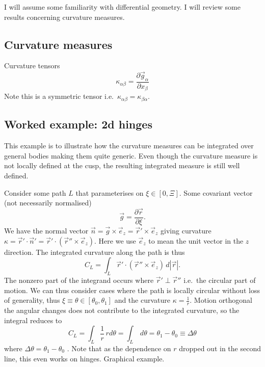 I will assume some familiarity with differential geometry.
I will review some results concerning curvature measures.

\subsection{Curvature measures}

Curvature tensors
\begin{equation}
  \kappa_{\alpha\beta} = \frac{\partial \vec{g}_\alpha}{\partial x_\beta}
\end{equation}
Note this is a symmetric tensor i.e.\ $\kappa_{\alpha\beta} = \kappa_{\beta\alpha}$.

\subsection{Worked example: 2d hinges}

This example is to illustrate how the curvature measures can be integrated over general bodies making them quite generic.
Even though the curvature measure is not locally defined at the cusp, the resulting integrated measure is still well defined.

Consider some path $L$ that parameterises on $\xi \in [0, \Xi]$.
Some covariant vector (not necessarily normalised)
\begin{equation*}
  \vec{g} = \frac{\partial \vec{r}}{\partial \xi}.
\end{equation*}
We have the normal vector $\vec{n} = \vec{g} \times \vec{e}_z = \vec{r}' \times \vec{e}_z$ giving curvature $\kappa = \vec{r}' \cdot \vec{n}' = \vec{r}' \cdot (\vec{r}'' \times \vec{e}_z)$.
Here we use $\vec{e}_z$ to mean the unit vector in the $z$ direction.
The integrated curvature along the path is thus
\begin{equation*}
  C_L = \int_L \vec{r}' \cdot ( \vec{r}'' \times \vec{e}_z ) \, d|\vec{r}|.
\end{equation*}
The nonzero part of the integrand occurs where $\vec{r}' \perp \vec{r}''$ i.e.\ the circular part of motion.
We can thus consider cases where the path is locally circular without loss of generality, thus $\xi \equiv \theta \in [\theta_0, \theta_1]$ and the curvature $\kappa = \tfrac{1}{r}$.
Motion orthogonal the angular changes does not contribute to the integrated curvature, so the integral reduces to
\begin{equation*}
  C_L = \int_L \frac{1}{r} \, r d\theta
  = \int_L \, d\theta
  = \theta_1 - \theta_0 \equiv \Delta\theta
\end{equation*}
where $\Delta\theta = \theta_1 - \theta_0$%
.
Note that as the dependence on $r$ dropped out in the second line, this even works on hinges.
Graphical example.

